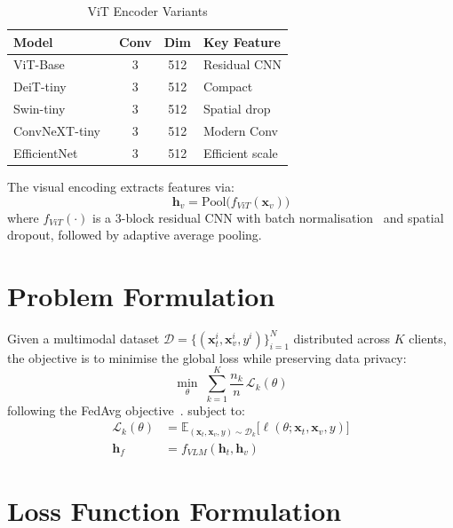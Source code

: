 \documentclass[12pt, a4paper, oneside]{Thesis}
\begin{document}
\begin{table}[t]
\caption{ViT Encoder Variants}
\label{tab:vitenc}
\centering\footnotesize
\begin{tabular}{lccp{2.1cm}}
\toprule
\textbf{Model} & \textbf{Conv} & \textbf{Dim} & \textbf{Key Feature}\\
\midrule
ViT-Base~\cite{Dosovitskiy2021}      & 3 & 512 & Residual CNN \\
DeiT-tiny~\cite{Touvron2021}     & 3 & 512 & Compact \\
Swin-tiny~\cite{Liu2021Swin}     & 3 & 512 & Spatial drop \\
ConvNeXT-tiny~\cite{Liu2022ConvNeXT} & 3 & 512 & Modern Conv \\
EfficientNet~\cite{Tan2019}  & 3 & 512 & Efficient scale \\
\bottomrule
\end{tabular}
\end{table}

The visual encoding extracts features via:
\begin{equation}
  \mathbf{h}_v = \mathrm{Pool}\!\bigl(f_{ViT}(\mathbf{x}_v)\bigr)
  \label{eq:visenc}
\end{equation}
where $f_{ViT}(\cdot)$ is a 3-block residual CNN with batch normalisation~\cite{IoffeSzegedy2015} and spatial
dropout, followed by adaptive average pooling.

\section{Problem Formulation}

Given a multimodal dataset $\mathcal{D} = \{(\mathbf{x}_t^i, \mathbf{x}_v^i,
y^i)\}_{i=1}^{N}$ distributed across $K$ clients, the objective is to minimise the
global loss while preserving data privacy:
\begin{equation}
  \min_{\theta}\; \sum_{k=1}^{K} \frac{n_k}{n}\,\mathcal{L}_k(\theta)
  \label{eq:fedobj}
\end{equation}
following the FedAvg objective~\cite{McMahan2017}.
subject to:
\begin{align}
  \mathcal{L}_k(\theta) &= \mathbb{E}_{(\mathbf{x}_t,\mathbf{x}_v,y)\sim\mathcal{D}_k}
    \bigl[\ell(\theta;\mathbf{x}_t,\mathbf{x}_v,y)\bigr] \label{eq:localobj}\\
  \mathbf{h}_f &= f_{VLM}(\mathbf{h}_t, \mathbf{h}_v) \label{eq:vlmfusion}
\end{align}

\section{Loss Function Formulation}
\end{document}
